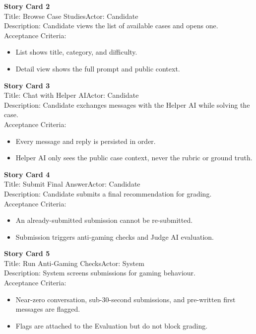 \documentclass[12pt,a4paper]{report}
\begin{document}
\noindent\textbf{Story Card 2}\\
Title: Browse Case Studies\quad Actor: Candidate\\
Description: Candidate views the list of available cases and opens one.\\
Acceptance Criteria:
\begin{itemize}[nosep]
    \item List shows title, category, and difficulty.
    \item Detail view shows the full prompt and public context.
\end{itemize}
\hrulefill

\noindent\textbf{Story Card 3}\\
Title: Chat with Helper AI\quad Actor: Candidate\\
Description: Candidate exchanges messages with the Helper AI while solving the case.\\
Acceptance Criteria:
\begin{itemize}[nosep]
    \item Every message and reply is persisted in order.
    \item Helper AI only sees the public case context, never the rubric or ground truth.
\end{itemize}
\hrulefill

\noindent\textbf{Story Card 4}\\
Title: Submit Final Answer\quad Actor: Candidate\\
Description: Candidate submits a final recommendation for grading.\\
Acceptance Criteria:
\begin{itemize}[nosep]
    \item An already-submitted submission cannot be re-submitted.
    \item Submission triggers anti-gaming checks and Judge AI evaluation.
\end{itemize}
\hrulefill

\noindent\textbf{Story Card 5}\\
Title: Run Anti-Gaming Checks\quad Actor: System\\
Description: System screens submissions for gaming behaviour.\\
Acceptance Criteria:
\begin{itemize}[nosep]
    \item Near-zero conversation, sub-30-second submissions, and pre-written first messages are
    flagged.
    \item Flags are attached to the Evaluation but do not block grading.
\end{itemize}
\hrulefill
\end{document}
